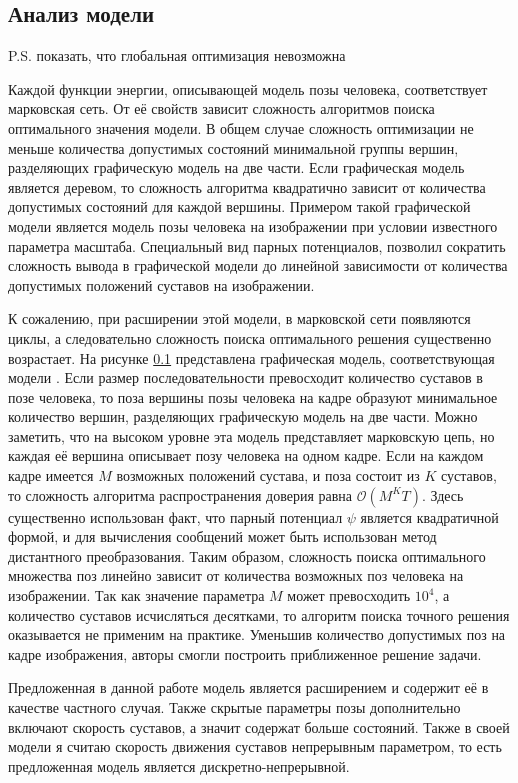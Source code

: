 \subsection{Анализ модели} P.S. показать, что глобальная оптимизация невозможна

Каждой функции энергии, описывающей модель позы человека, соответствует марковская сеть. От её свойств зависит сложность алгоритмов поиска оптимального значения модели. В общем случае сложность оптимизации не меньше количества допустимых состояний минимальной группы вершин, разделяющих графическую модель на две части. Если графическая модель является деревом, то сложность алгоритма квадратично зависит от количества допустимых состояний для каждой вершины. Примером такой графической модели является модель позы человека на изображении при условии известного параметра масштаба. Специальный вид парных потенциалов, позволил сократить сложность вывода в графической модели до линейной зависимости от количества допустимых положений суставов на изображении.

К сожалению, при расширении этой модели, в марковской сети появляются циклы, а следовательно сложность поиска оптимального решения существенно возрастает. На рисунке \ref{} представлена графическая модель, соответствующая модели \cite{park2011n}. Если размер последовательности превосходит количество суставов в позе человека, то поза вершины позы человека на кадре образуют минимальное количество вершин, разделяющих графическую модель на две части. Можно заметить, что на высоком уровне эта модель представляет марковскую цепь, но каждая её вершина описывает позу человека на одном кадре. Если на каждом кадре имеется $M$ возможных положений сустава, и поза состоит из $K$ суставов, то сложность алгоритма распространения доверия равна $\mathcal{O}(M^{K}T)$. Здесь существенно использован факт, что парный потенциал $\psi$ является квадратичной формой, и для вычисления сообщений может быть использован метод дистантного преобразования. Таким образом, сложность поиска оптимального множества поз линейно зависит от количества возможных поз человека на изображении. Так как значение параметра $M$ может превосходить $10^4$, а количество суставов исчисляться десятками, то алгоритм поиска точного решения оказывается не применим на практике. Уменьшив количество допустимых поз на кадре изображения, авторы \cite{park2011n} смогли построить приближенное решение задачи.

Предложенная в данной работе модель является расширением \cite{park2011n} и содержит её в качестве частного случая. Также скрытые параметры позы дополнительно включают скорость суставов, а значит содержат больше состояний. Также в своей модели я считаю скорость движения суставов непрерывным параметром, то есть предложенная модель является дискретно-непрерывной.

